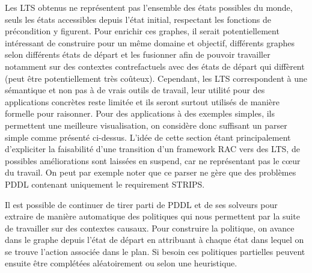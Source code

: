 Les LTS obtenus ne représentent pas l'ensemble des états possibles du monde, seuls les états accessibles depuis l'état initial, respectant les fonctions de précondition y figurent. Pour enrichir ces graphes, il serait potentiellement intéressant de construire pour un même domaine et objectif,  différents graphes selon différents états de départ et les fusionner afin de pouvoir travailler notamment sur des contextes contrefactuels avec des états de départ qui diffèrent (peut être potentiellement très coûteux). Cependant, les LTS correspondent à une sémantique et non pas à de vrais outils de travail, leur utilité pour des applications concrètes reste limitée et ils seront surtout utilisés de manière formelle pour raisonner. Pour des applications à des exemples simples, ils permettent une meilleure visualisation, on considère donc suffisant un parser simple comme présenté ci-dessus. L'idée de cette section étant principalement d'expliciter la faisabilité d'une transition d'un framework RAC vers des LTS, de possibles améliorations sont laissées en suspend, car ne représentant pas le cœur du travail. On peut par exemple noter que ce parser ne gère que des problèmes PDDL contenant uniquement le requirement STRIPS. 

Il est possible de continuer de tirer parti de PDDL et de ses solveurs pour extraire de manière automatique des politiques qui nous permettent par la suite de travailler sur des contextes causaux. Pour construire la politique, on avance dans le graphe depuis l'état de départ en attribuant à chaque état dans lequel on se trouve l'action associée dans le plan. Si besoin ces politiques partielles peuvent ensuite être complétées aléatoirement ou selon une heuristique.

